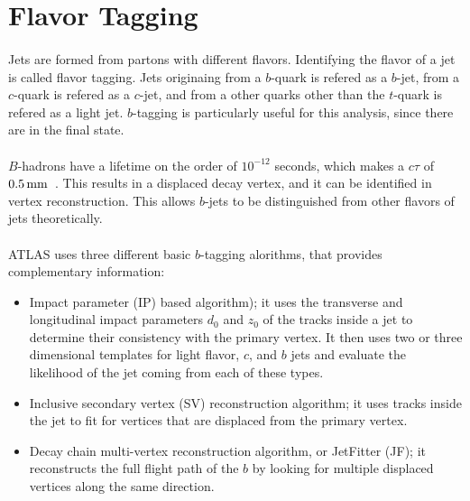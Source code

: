 \section{Flavor Tagging}
\paragraph{}
Jets are formed from partons with different flavors. 
Identifying the flavor of a jet is called flavor tagging. 
Jets originaing from a $b$-quark is refered as a $b$-jet, from a $c$-quark is refered as a $c$-jet, and from a other quarks other than the $t$-quark is refered as a light jet.
$b$-tagging is particularly useful for this analysis, since there are \bbbb in the final state. 

\paragraph{}
$B$-hadrons have a lifetime on the order of $10^{-12}$ seconds, which makes a $c\tau$ of $0.5\,\rm mm$~\cite{Pdg}. 
This results in a displaced decay vertex, and it can be identified in vertex reconstruction. 
This allows $b$-jets to be distinguished from other flavors of jets theoretically.

\paragraph{}
ATLAS uses three different basic $b$-tagging alorithms, that provides complementary information:
\begin{itemize}
	\item Impact parameter (IP) based algorithm); it uses the transverse and longitudinal impact parameters $d_0$ and $z_0$ of the tracks inside a jet to determine their consistency with the primary vertex. It then uses two or three dimensional templates for light flavor, $c$, and $b$ jets and evaluate the likelihood of the jet coming from each of these types.
	\item Inclusive secondary vertex (SV) reconstruction algorithm; it uses tracks inside the jet to fit for vertices that are displaced from the primary vertex.
	\item Decay chain multi-vertex reconstruction algorithm, or JetFitter (JF); it reconstructs the full flight path of the $b$ by looking for multiple displaced vertices along the same direction.
\end{itemize}
 
